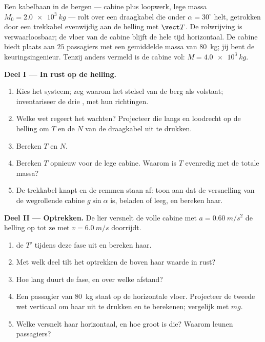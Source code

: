 \begin{problem}
\label{pb:g12:newtons-laws:1}
Een kabelbaan in de bergen --- cabine plus loopwerk, lege massa
$M_0 = \qty{2.0e3}{kg}$ --- rolt over een draagkabel die onder $\alpha = 30^\circ$
helt, getrokken door een trekkabel evenwijdig aan de helling met 
$\vect T$. De rolwrijving is verwaarloosbaar; de vloer van de cabine blijft de hele
tijd horizontaal. De cabine biedt plaats aan $25$ passagiers met een gemiddelde massa
van \qty{80}{kg}; jij bent de keuringsingenieur. Tenzij anders vermeld is de cabine
vol: $M = \qty{4.0e3}{kg}$.

\medskip
\noindent\textbf{Deel I --- In rust op de helling.}
\begin{enumerate}
  \item Kies het systeem; zeg waarom het stelsel van de berg als 
        volstaat; inventariseer de drie , met hun richtingen.
  \item Welke wet regeert het wachten? Projecteer die langs en loodrecht op de
        helling om $T$ en de  $N$ van de draagkabel uit te drukken.
  \item Bereken $T$ en $N$.
  \item Bereken $T$ opnieuw voor de lege cabine. Waarom is $T$ evenredig met de
        totale massa?
  \item De trekkabel knapt en de remmen staan af: toon aan dat de versnelling van de
        wegrollende cabine $g \sin\alpha$ is, beladen of leeg, en bereken haar.
\end{enumerate}

\medskip
\noindent\textbf{Deel II --- Optrekken.} De lier versnelt de volle cabine met
$a = \qty{0.60}{m/s^2}$ de helling op tot ze met $v = \qty{6.0}{m/s}$ doorrijdt.
\begin{enumerate}[resume]
  \item {} de  $T'$ tijdens deze fase uit en bereken haar.
  \item Met welk deel tilt het optrekken de  boven haar waarde in rust?
  \item Hoe lang duurt de fase, en over welke afstand?
  \item Een passagier van \qty{80}{kg} staat op de horizontale vloer. Projecteer de
        tweede wet verticaal om haar  uit te drukken en te
        berekenen; vergelijk met $mg$.
  \item Welke  versnelt haar horizontaal, en hoe groot is die? Waarom leunen
        passagiers?
\end{enumerate}


\end{problem}
